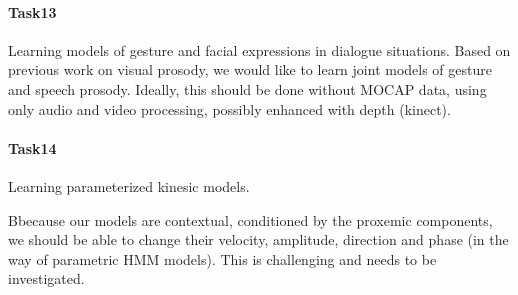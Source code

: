 \paragraph{Task13} Learning models of gesture and facial expressions in dialogue situations.
Based on previous work on  visual prosody, we would like to learn joint models of gesture and  speech prosody. Ideally, this should be done without MOCAP data, using only audio and video processing, possibly enhanced with depth (kinect).

\paragraph{Task14}  Learning parameterized kinesic models. 

Bbecause our models are contextual, conditioned by the proxemic components, we should be able to change their velocity,  amplitude, direction and phase (in the way of parametric HMM models). This is challenging and needs to be investigated. 

\endinput